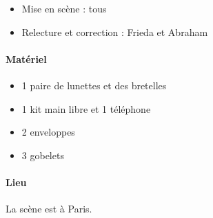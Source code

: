 	\begin{itemize}
	\item Mise en scène : tous
	\item Relecture et correction : Frieda et Abraham
	\end{itemize}
	
	\paragraph{Matériel}
	
	\begin{itemize}
	\item 1 paire de lunettes et des bretelles
	\item 1 kit main libre et 1 téléphone
	\item 2 enveloppes
	\item 3 gobelets
	\end{itemize}
	
	\paragraph{Lieu}
	
	La scène est à Paris.